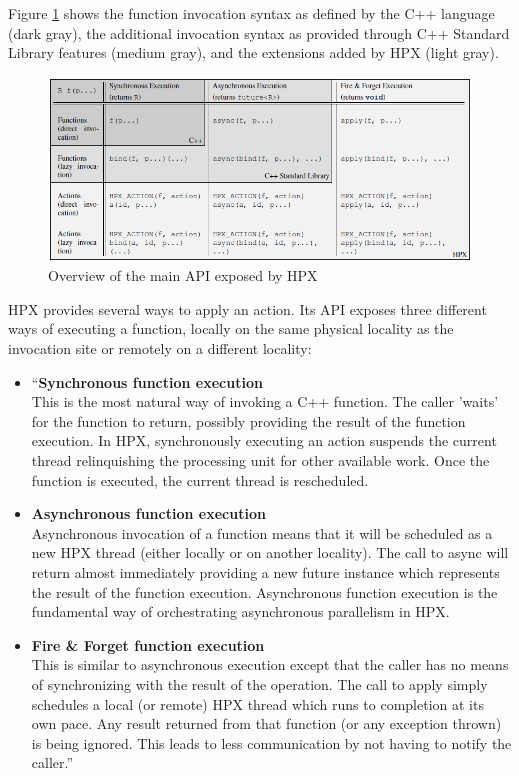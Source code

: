 Figure \ref{fig:hpx-api} shows the function invocation syntax as defined by the C++ language (dark gray), the additional invocation syntax as provided through C++ Standard Library features (medium gray), and the extensions added by HPX (light gray)\cite{kaiser2014hpx}.

\begin{figure}[h!]
\centering
\includegraphics[scale=0.72]{images/hpx_the_api.png}
\caption[Overview of the main API exposed by HPX]{Overview of the main API exposed by HPX~\cite{kaiser2014hpx}}
\label{fig:hpx-api}
\end{figure}

HPX provides several ways to apply an action. Its API exposes three different ways of executing a function, locally on the same physical locality as the invocation site or remotely on a different locality:

\begin{itemize}
\item ``\textbf{Synchronous function execution}\\
  This is the most natural way of invoking a C++ function. The caller ’waits’ for the function to return, possibly providing the result of the function execution. In HPX, synchronously executing an action suspends the current thread relinquishing the processing unit for other available work. Once the function is executed, the current thread is rescheduled.

\item \textbf{Asynchronous function execution}\\
  Asynchronous invocation of a function means that it will be scheduled as a new HPX thread (either locally or on another locality). The call to async will return almost immediately providing a new future instance which represents the result of the function execution. Asynchronous function execution is the fundamental way of orchestrating asynchronous parallelism in HPX.

\item \textbf{Fire \& Forget function execution}\\
  This is similar to asynchronous execution except that the caller has no means of synchronizing with the result of the operation. The call to apply simply schedules a local (or remote) HPX thread which runs to completion at its own pace. Any result returned from that function (or any exception thrown) is being ignored. This leads to less communication by not having to notify the caller.''\cite{kaiser2014hpx}
\end{itemize}


